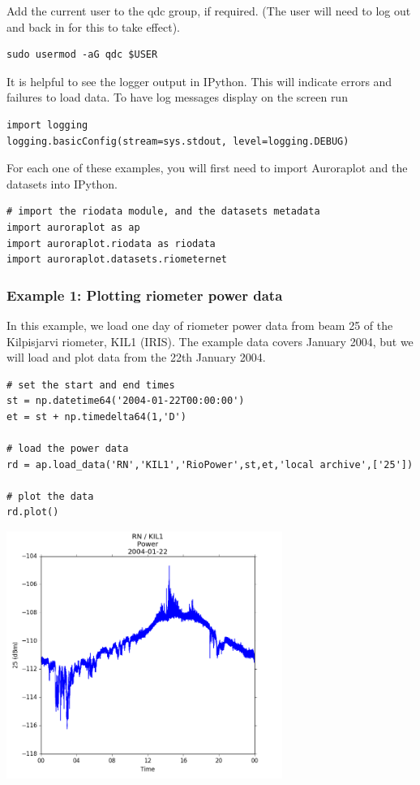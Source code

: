 \documentclass{article}
\begin{document}
Add the current user to the qdc group, if required. (The user will need to log out and back in for this to take effect).

\begin{lstlisting}
sudo usermod -aG qdc $USER
\end{lstlisting}

It is helpful to see the logger output in IPython. This will indicate errors and failures to load data. To have log messages display on the screen run

\begin{lstlisting}[style=pythonstyle]
import logging
logging.basicConfig(stream=sys.stdout, level=logging.DEBUG)
\end{lstlisting}

For each one of these examples, you will first need to import Auroraplot and the datasets into IPython.

\begin{lstlisting}[style=pythonstyle]
# import the riodata module, and the datasets metadata
import auroraplot as ap
import auroraplot.riodata as riodata
import auroraplot.datasets.riometernet
\end{lstlisting}



\subsubsection{Example 1: Plotting riometer power data}

In this example, we load one day of riometer power data from beam 25 of the Kilpisjarvi riometer, KIL1 (IRIS). The example data covers January 2004, but we will load and plot data from the 22th January 2004.

\begin{lstlisting}[style=pythonstyle]
# set the start and end times
st = np.datetime64('2004-01-22T00:00:00')
et = st + np.timedelta64(1,'D')

# load the power data
rd = ap.load_data('RN','KIL1','RioPower',st,et,'local archive',['25'])

# plot the data
rd.plot()
\end{lstlisting}

\includegraphics[width=9cm]{images/figure_1.png}
\end{document}
